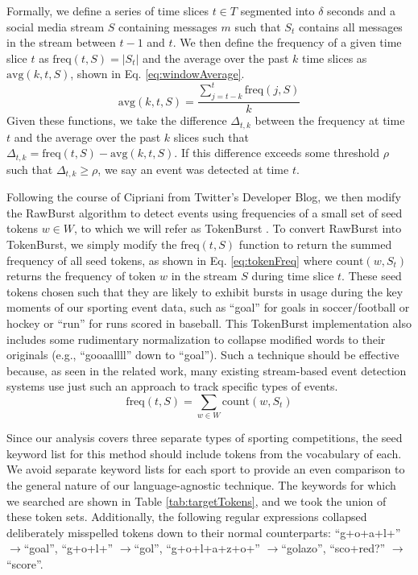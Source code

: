 \documentclass[letterpaper]{article}
\begin{document}
Formally, we define a series of time slices $t \in T$ segmented into $\delta$ seconds and a social media stream $S$ containing messages $m$ such that $S_t$ contains all messages in the stream between $t-1$ and $t$.
We then define the frequency of a given time slice $t$ as $\text{freq}(t, S) = |S_t|$ and the average over the past $k$ time slices as $\text{avg}(k, t, S)$, shown in Eq. \ref{eq:windowAverage}.
%
\begin{equation}
\label{eq:windowAverage}
\text{avg}(k, t, S) = \frac{\sum_{j=t-k}^{t}\text{freq}(j, S)}{k}
\end{equation}
%
Given these functions, we take the difference $\Delta_{t, k}$ between the frequency at time $t$ and the average over the past $k$ slices such that $\Delta_{t, k} = \text{freq}(t, S) - \text{avg}(k, t, S)$.
If this difference exceeds some threshold $\rho$ such that $\Delta_{t, k} \ge \rho$, we say an event was detected at time $t$.

Following the course of Cipriani from Twitter's Developer Blog, we then modify the RawBurst algorithm to detect events using frequencies of a small set of seed tokens $w \in W$, to which we will refer as TokenBurst  \cite{Cipriani2014}. 
To convert RawBurst into TokenBurst, we simply modify the $\text{freq}(t, S)$ function to return the summed frequency of all seed tokens, as shown in Eq. \ref{eq:tokenFreq} where $\text{count}(w, S_t)$ returns the frequency of token $w$ in the stream $S$ during time slice $t$. 
These seed tokens chosen such that they are likely to exhibit bursts in usage during the key moments of our sporting event data, such as ``goal'' for goals in soccer/football or hockey or ``run'' for runs scored in baseball.
This TokenBurst implementation also includes some rudimentary normalization to collapse modified words to their originals (e.g., ``gooaallll'' down to ``goal'').
Such a technique should be effective because, as seen in the related work, many existing stream-based event detection systems use just such an approach to track specific types of events.
%
\begin{equation}
\label{eq:tokenFreq}
\text{freq}(t, S) = \sum_{w \in W}\text{count}(w, S_t)
\end{equation}

Since our analysis covers three separate types of sporting competitions, the seed keyword list for this method should include tokens from the vocabulary of each. 
We avoid separate keyword lists for each sport to provide an even comparison to the general nature of our language-agnostic technique.
The keywords for which we searched are shown in Table \ref{tab:targetTokens}, and we took the union of these token sets.
Additionally, the following regular expressions collapsed deliberately misspelled tokens down to their normal counterparts: ``g+o+a+l+'' $\rightarrow$``goal'', ``g+o+l+'' $\rightarrow$``gol'', ``g+o+l+a+z+o+'' $\rightarrow$``golazo'', ``sco+red?'' $\rightarrow$``score''.
\end{document}
